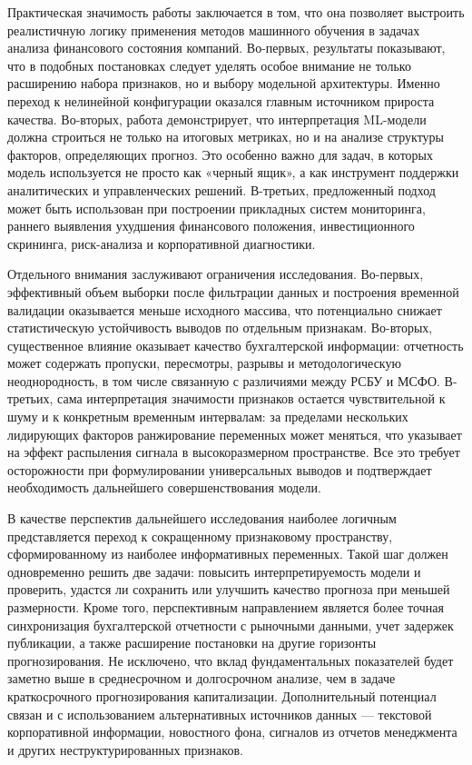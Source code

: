 \documentclass[
]{article}
\begin{document}
Практическая значимость работы заключается в том, что она позволяет выстроить реалистичную логику применения методов машинного обучения в задачах анализа финансового состояния компаний. Во-первых, результаты показывают, что в подобных постановках следует уделять особое внимание не только расширению набора признаков, но и выбору модельной архитектуры. Именно переход к нелинейной конфигурации оказался главным источником прироста качества. Во-вторых, работа демонстрирует, что интерпретация ML-модели должна строиться не только на итоговых метриках, но и на анализе структуры факторов, определяющих прогноз. Это особенно важно для задач, в которых модель используется не просто как «черный ящик», а как инструмент поддержки аналитических и управленческих решений. В-третьих, предложенный подход может быть использован при построении прикладных систем мониторинга, раннего выявления ухудшения финансового положения, инвестиционного скрининга, риск-анализа и корпоративной диагностики.

Отдельного внимания заслуживают ограничения исследования. Во-первых, эффективный объем выборки после фильтрации данных и построения временной валидации оказывается меньше исходного массива, что потенциально снижает статистическую устойчивость выводов по отдельным признакам. Во-вторых, существенное влияние оказывает качество бухгалтерской информации: отчетность может содержать пропуски, пересмотры, разрывы и методологическую неоднородность, в том числе связанную с различиями между РСБУ и МСФО. В-третьих, сама интерпретация значимости признаков остается чувствительной к шуму и к конкретным временным интервалам: за пределами нескольких лидирующих факторов ранжирование переменных может меняться, что указывает на эффект распыления сигнала в высокоразмерном пространстве. Все это требует осторожности при формулировании универсальных выводов и подтверждает необходимость дальнейшего совершенствования модели.

В качестве перспектив дальнейшего исследования наиболее логичным представляется переход к сокращенному признаковому пространству, сформированному из наиболее информативных переменных. Такой шаг должен одновременно решить две задачи: повысить интерпретируемость модели и проверить, удастся ли сохранить или улучшить качество прогноза при меньшей размерности. Кроме того, перспективным направлением является более точная синхронизация бухгалтерской отчетности с рыночными данными, учет задержек публикации, а также расширение постановки на другие горизонты прогнозирования. Не исключено, что вклад фундаментальных показателей будет заметно выше в среднесрочном и долгосрочном анализе, чем в задаче краткосрочного прогнозирования капитализации. Дополнительный потенциал связан и с использованием альтернативных источников данных --- текстовой корпоративной информации, новостного фона, сигналов из отчетов менеджмента и других неструктурированных признаков.
\end{document}
